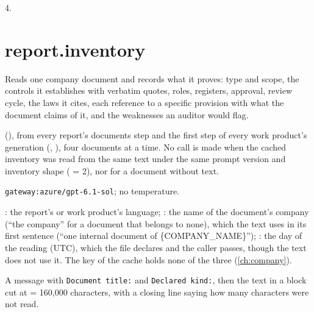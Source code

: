  4.


\section{report.inventory}\label{sec:aprompts:report-inventory}

 Reads one company document and records what it proves: type and
scope, the controls it establishes with verbatim quotes, roles, registers, approval, review
cycle, the laws it cites, each reference to a specific provision with what the document claims
of it, and the weaknesses an auditor would flag.

  (), from every
report's documents step and the first step of every work product's generation
(, ), four documents at a time. No call is made when
the cached inventory was read from the same text under the same prompt version and inventory
shape ( = 2), nor for a document without text.

 \texttt{gateway:azure/gpt-6.1-sol}; no temperature.

 : the report's or work product's language;
: the name of the document's company (\enquote{the company} for a
document that belongs to none), which the text uses in its first sentence (\enquote{one
internal document of \{COMPANY\_NAME\}}); : the day of the reading (UTC),
which the file declares and the caller passes, though the text does not use it. The key of
the cache holds none of the three (\cref{ch:company}).

 A message with \texttt{Document title:} and
\texttt{Declared kind:}, then the text in a  block cut at
 = 160{,}000 characters, with a closing line saying how many
characters were not read.

